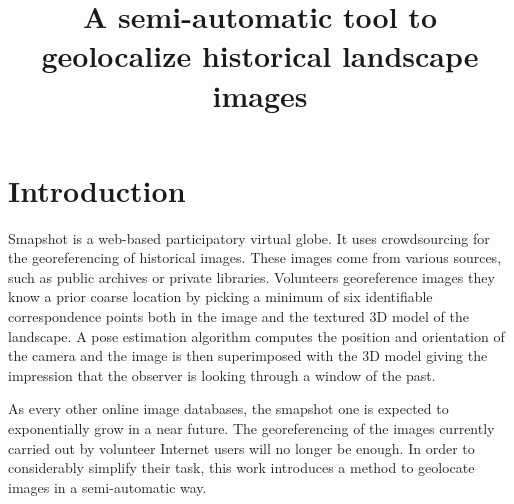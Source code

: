 \documentclass[fleqn,10pt]{wlpeerj} %
\title{A semi-automatic tool to geolocalize historical landscape images}
\begin{document}
\flushbottom
\maketitle
\thispagestyle{empty}

\section*{Introduction}
Smapshot is a web-based participatory virtual globe. It uses crowdsourcing for 
the georeferencing of historical images. These images come from various sources, 
such as public archives or private libraries. Volunteers georeference images 
they know a prior coarse location by picking a minimum of six identifiable 
correspondence points both in the image and the textured 3D model of the landscape. 
A pose estimation algorithm computes the position and orientation of the camera 
and the image is then superimposed  with the 3D model giving the impression that 
the observer is looking through a window of the past.

As every other online image databases, the smapshot one is expected to 
exponentially grow in a near future. The georeferencing of the images currently 
carried out by volunteer Internet users will no longer be enough.
In order to considerably simplify their task, this work introduces a method to
geolocate images in a semi-automatic way.

\end{document}
